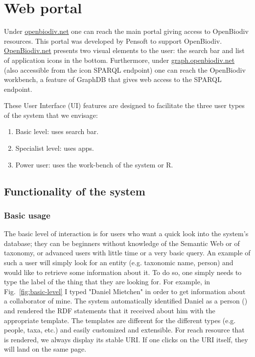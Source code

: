 
\chapter{Web portal} %
\label{chapter-webportal}


Under \href{http://openbiodiv.net}{\url{openbiodiv.net}} one can reach the main portal giving access to OpenBiodiv resources. This portal was developed by Pensoft to support OpenBiodiv. \href{http://openbiodiv.net}{OpenBiodiv.net} presents two visual elements to the user: the search bar and list of application icons in the bottom. Furthermore, under \href{http://graph.openbiodiv.net}{\url{graph.openbiodiv.net}} (also accessible from the icon SPARQL endpoint) one can reach the OpenBiodiv workbench, a feature of GraphDB that gives web access to the SPARQL endpoint.

These User Interface (UI) features are designed to facilitate the three user types of the system that we envisage:

\begin{enumerate}
    \item Basic level: uses search bar.
    \item Specialist level: uses apps.
    \item Power user: uses the work-bench of the system or R.
\end{enumerate}

\section{Functionality of the system}

\subsection{Basic usage}

The basic level of interaction is for users who want a quick look into the system's database; they can be beginners without knowledge of the Semantic Web or of taxonomy, or advanced users with little time or a very basic query. An example of such a user will simply look for an entity (e.g. taxonomic name, person) and would like to retrieve some information about it. To do so, one simply needs to type the label of the thing that they are looking for. For example, in Fig.~\ref{fig:basic-level} I typed "Daniel Mietchen" in order to get information about a collaborator of mine. The system automatically identified Daniel as a person () and rendered the RDF statements that it received about him with the appropriate template. The templates are different for the different types (e.g. people, taxa, etc.) and easily customized and extensible. For reach resource that is rendered, we always display its stable URI. If one clicks on the URI itself, they will land on the same page.

